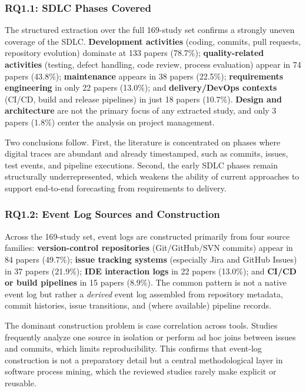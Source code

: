 \subsubsection{RQ1.1: SDLC Phases Covered}

The structured extraction over the full 169-study set confirms a strongly
uneven coverage of the SDLC. \textbf{Development activities} (coding,
commits, pull requests, repository evolution) dominate at 133 papers
(78.7\%); \textbf{quality-related activities} (testing, defect handling, code
review, process evaluation) appear in 74 papers (43.8\%);
\textbf{maintenance} appears in 38 papers (22.5\%);
\textbf{requirements engineering} in only 22 papers (13.0\%); and
\textbf{delivery/DevOps contexts} (CI/CD, build and release pipelines) in
just 18 papers (10.7\%). \textbf{Design and architecture} are not the primary
focus of any extracted study, and only 3 papers (1.8\%) center the analysis
on project management.

Two conclusions follow. First, the literature is concentrated on phases where
digital traces are abundant and already timestamped, such as commits, issues,
test events, and pipeline executions. Second, the early SDLC phases remain
structurally underrepresented, which weakens the ability of current
approaches to support end-to-end forecasting from requirements to delivery.

\subsubsection{RQ1.2: Event Log Sources and Construction}

Across the 169-study set, event logs are constructed primarily from four
source families: \textbf{version-control repositories} (Git/GitHub/SVN
commits) appear in 84 papers (49.7\%); \textbf{issue tracking systems}
(especially Jira and GitHub Issues) in 37 papers (21.9\%); \textbf{IDE
interaction logs} in 22 papers (13.0\%); and \textbf{CI/CD or build
pipelines} in 15 papers (8.9\%). The common pattern is not a native event
log but rather a \emph{derived} event log assembled from repository metadata,
commit histories, issue transitions, and (where available) pipeline records.

The dominant construction problem is case correlation across tools. Studies
frequently analyze one source in isolation or perform ad hoc joins between
issues and commits, which limits reproducibility. This confirms that event-log
construction is not a preparatory detail but a central methodological layer in
software process mining, which the reviewed studies rarely make explicit or
reusable.

